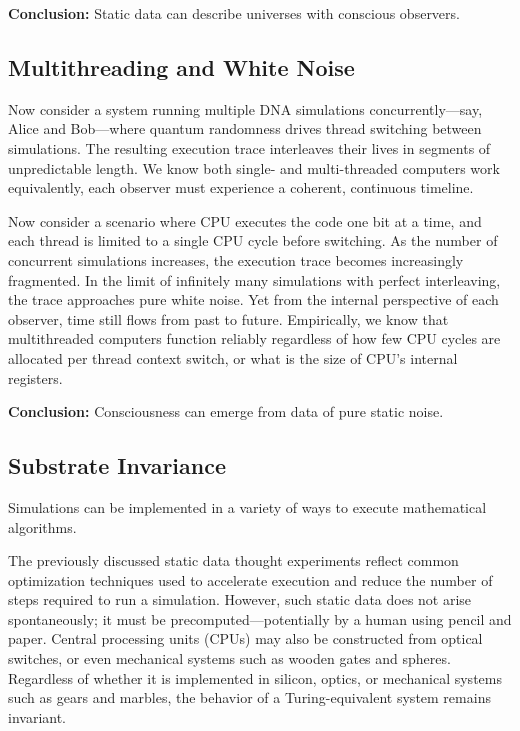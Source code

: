 \documentclass[11pt]{article}
\begin{document}
\textbf{Conclusion:} Static data can describe universes with conscious observers.



\subsection{Multithreading and White Noise}

Now consider a system running multiple DNA simulations concurrently—say, Alice and Bob—where quantum randomness drives thread switching between simulations. The resulting execution trace interleaves their lives in segments of unpredictable length. We know both single- and multi-threaded computers work equivalently, each observer must experience a coherent, continuous timeline.

Now consider a scenario where CPU executes the code one bit at a  time, and each thread is limited to a single CPU cycle before switching. As the number of concurrent simulations increases, the execution trace becomes increasingly fragmented. In the limit of infinitely many simulations with perfect interleaving, the trace approaches pure white noise. Yet from the internal perspective of each observer, time still flows from past to future. Empirically, we know that multithreaded computers function reliably regardless of how few CPU cycles are allocated per thread context switch, or what is the size of CPU's internal registers.

\textbf{Conclusion:} Consciousness can emerge from data of pure static noise.


\subsection{Substrate Invariance}

Simulations can be implemented in a variety of ways to execute mathematical algorithms.

The previously discussed static data thought experiments reflect common optimization techniques used to accelerate execution and reduce the number of steps required to run a simulation. However, such static data does not arise spontaneously; it must be precomputed—potentially by a human using pencil and paper. Central processing units (CPUs) may also be constructed from optical switches, or even mechanical systems such as wooden gates and spheres. Regardless of whether it is implemented in silicon, optics, or mechanical systems such as gears and marbles, the behavior of a Turing-equivalent system remains invariant.
\end{document}
